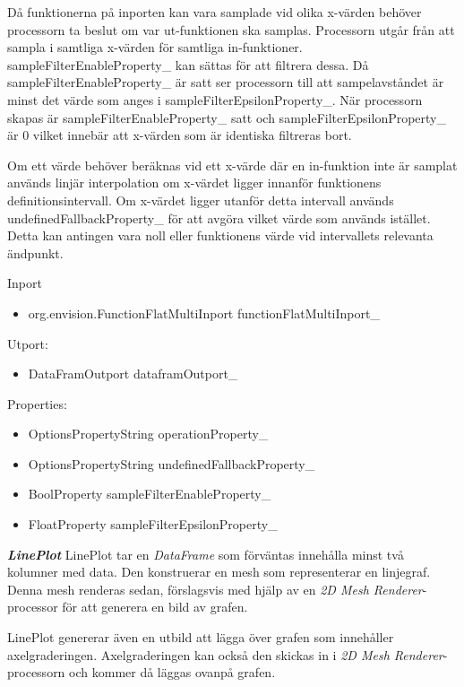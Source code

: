 Då funktionerna på inporten kan vara samplade vid olika x-värden behöver processorn ta beslut om var ut-funktionen ska samplas. Processorn utgår från att sampla i samtliga x-värden för samtliga in-funktioner. sampleFilterEnableProperty\_ kan sättas för att filtrera dessa. Då sampleFilterEnableProperty\_ är satt ser processorn till att sampelavståndet är minst det värde som anges i sampleFilterEpsilonProperty\_. När processorn skapas är sampleFilterEnableProperty\_ satt och sampleFilterEpsilonProperty\_ är 0 vilket innebär att x-värden som är identiska filtreras bort.

Om ett värde behöver beräknas vid ett x-värde där en in-funktion inte är samplat används linjär interpolation om x-värdet ligger innanför funktionens definitionsintervall. Om x-värdet ligger utanför detta intervall används undefinedFallbackProperty\_ för att avgöra vilket värde som används istället. Detta kan antingen vara noll eller funktionens värde vid intervallets relevanta ändpunkt.

Inport
\begin{itemize}
\item org.envision.FunctionFlatMultiInport functionFlatMultiInport\_ 
\end{itemize}

Utport:
\begin{itemize}
\item DataFramOutport dataframOutport\_
\end{itemize}

Properties:
\begin{itemize}
    \setlength\itemsep{0em}
    \item OptionsPropertyString operationProperty\_
    \item OptionsPropertyString undefinedFallbackProperty\_
    \item BoolProperty sampleFilterEnableProperty\_
    \item FloatProperty sampleFilterEpsilonProperty\_
\end{itemize}

\textbf{\textit{LinePlot}}\newline
LinePlot tar en \emph{DataFrame} som förväntas innehålla minst två kolumner med data. Den konstruerar en mesh som
representerar en linjegraf. Denna mesh renderas sedan, förslagsvis med hjälp av en \emph{2D Mesh Renderer}-processor för att generera en bild av grafen.

LinePlot genererar även en utbild att lägga över grafen som innehåller axelgraderingen. Axelgraderingen kan också den skickas in i \emph{2D Mesh Renderer}-processorn och kommer då läggas ovanpå grafen.

